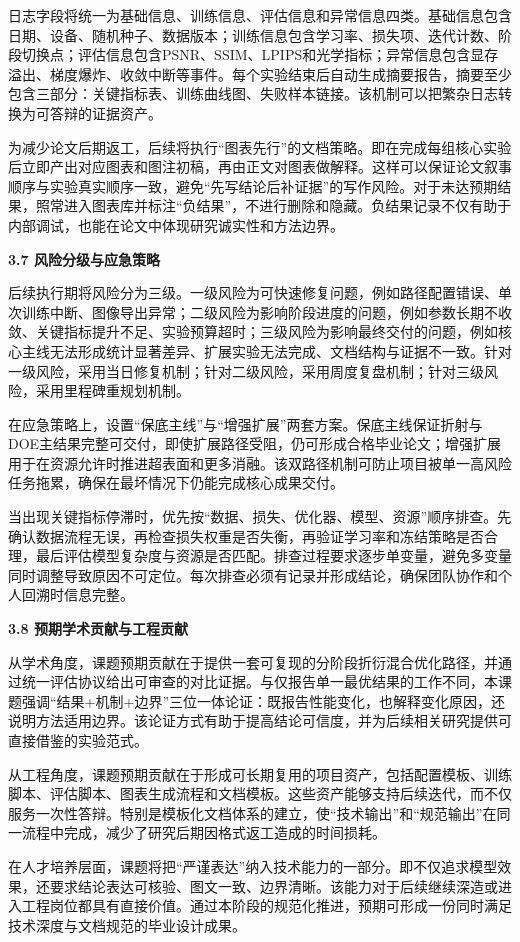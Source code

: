 \documentclass[UTF8,12pt,fontset=fandol]{ctexart}
\newcommand{\hfirst}[1]{%
\vspace{0.6em}
\noindent\textbf{#1}\par
}
\begin{document}
日志字段将统一为基础信息、训练信息、评估信息和异常信息四类。基础信息包含日期、设备、随机种子、数据版本；训练信息包含学习率、损失项、迭代计数、阶段切换点；评估信息包含PSNR、SSIM、LPIPS和光学指标；异常信息包含显存溢出、梯度爆炸、收敛中断等事件。每个实验结束后自动生成摘要报告，摘要至少包含三部分：关键指标表、训练曲线图、失败样本链接。该机制可以把繁杂日志转换为可答辩的证据资产。

为减少论文后期返工，后续将执行“图表先行”的文档策略。即在完成每组核心实验后立即产出对应图表和图注初稿，再由正文对图表做解释。这样可以保证论文叙事顺序与实验真实顺序一致，避免“先写结论后补证据”的写作风险。对于未达预期结果，照常进入图表库并标注“负结果”，不进行删除和隐藏。负结果记录不仅有助于内部调试，也能在论文中体现研究诚实性和方法边界。

\hfirst{3.7 风险分级与应急策略}
后续执行期将风险分为三级。一级风险为可快速修复问题，例如路径配置错误、单次训练中断、图像导出异常；二级风险为影响阶段进度的问题，例如参数长期不收敛、关键指标提升不足、实验预算超时；三级风险为影响最终交付的问题，例如核心主线无法形成统计显著差异、扩展实验无法完成、文档结构与证据不一致。针对一级风险，采用当日修复机制；针对二级风险，采用周度复盘机制；针对三级风险，采用里程碑重规划机制。

在应急策略上，设置“保底主线”与“增强扩展”两套方案。保底主线保证折射与DOE主结果完整可交付，即使扩展路径受阻，仍可形成合格毕业论文；增强扩展用于在资源允许时推进超表面和更多消融。该双路径机制可防止项目被单一高风险任务拖累，确保在最坏情况下仍能完成核心成果交付。

当出现关键指标停滞时，优先按“数据、损失、优化器、模型、资源”顺序排查。先确认数据流程无误，再检查损失权重是否失衡，再验证学习率和冻结策略是否合理，最后评估模型复杂度与资源是否匹配。排查过程要求逐步单变量，避免多变量同时调整导致原因不可定位。每次排查必须有记录并形成结论，确保团队协作和个人回溯时信息完整。

\hfirst{3.8 预期学术贡献与工程贡献}
从学术角度，课题预期贡献在于提供一套可复现的分阶段折衍混合优化路径，并通过统一评估协议给出可审查的对比证据。与仅报告单一最优结果的工作不同，本课题强调“结果+机制+边界”三位一体论证：既报告性能变化，也解释变化原因，还说明方法适用边界。该论证方式有助于提高结论可信度，并为后续相关研究提供可直接借鉴的实验范式。

从工程角度，课题预期贡献在于形成可长期复用的项目资产，包括配置模板、训练脚本、评估脚本、图表生成流程和文档模板。这些资产能够支持后续迭代，而不仅服务一次性答辩。特别是模板化文档体系的建立，使“技术输出”和“规范输出”在同一流程中完成，减少了研究后期因格式返工造成的时间损耗。

在人才培养层面，课题将把“严谨表达”纳入技术能力的一部分。即不仅追求模型效果，还要求结论表达可核验、图文一致、边界清晰。该能力对于后续继续深造或进入工程岗位都具有直接价值。通过本阶段的规范化推进，预期可形成一份同时满足技术深度与文档规范的毕业设计成果。
\end{document}
